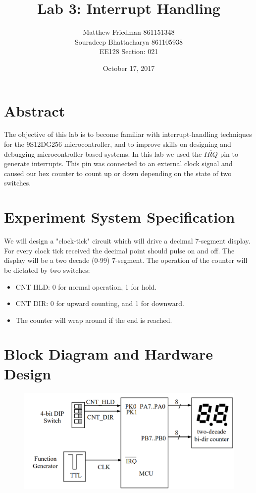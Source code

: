 \documentclass{article}
\title{Lab 3: Interrupt Handling}
\date{October 17, 2017}
\author{Matthew Friedman 861151348\\Souradeep Bhattacharya 861105938\\EE128 Section: 021}
\begin{document}
	\maketitle
	
	\section*{Abstract}
	\par
	The objective of this lab is to become familiar with interrupt-handling techniques for the 9S12DG256 microcontroller, and to improve skills on designing and debugging microcontroller based systems. In this lab we used the $\overline{IRQ}$ pin to generate interrupts. This pin was connected to an external clock signal and caused our hex counter to count up or down depending on the state of two switches.
	\section*{Experiment System Specification}
	\par
	We will design a "clock-tick" circuit which will drive a decimal 7-segment display. For every clock tick received the decimal point should pulse on and off. The display will be a two decade (0-99) 7-segment. The operation of the counter will be dictated by two switches:
	\begin{itemize}
		\item CNT HLD: 0 for normal operation, 1 for hold.
		\item CNT DIR: 0 for upward counting, and 1 for downward.
		\item The counter will wrap around if the end is reached.
	\end{itemize}
	\section*{Block Diagram and Hardware Design}
	\begin{figure}[H]
		\centering
		\includegraphics[width=1\textwidth]{Block_Diagram}
	\end{figure}
\end{document}
